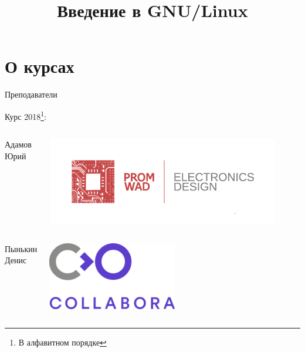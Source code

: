 

\title{Введение в GNU/Linux}





\begin{frame}
	\frametitle{}
	\titlepage
	\vspace{-0.5cm}
	\begin{center}
	\end{center}
\end{frame}


\begin{frame}
	\tableofcontents
	[hideallsubsections]
\end{frame}

\section{О курсах}

\begin{frame}{Преподаватели}

    \Large{Курс 2018\footnote{В алфавитном порядке}}:

    \begin{columns}
        Адамов Юрий
        \begin{center}
            \includegraphics[width=0.9\textwidth]{Promwad_logo.png}
        \end{center}
    \end{columns}

    \begin{columns}
        Пынькин Денис
        \begin{center}
            \includegraphics[width=0.5\textwidth]{COLLABORA_02_RGB.png}
        \end{center}
    \end{columns}
\end{frame}


